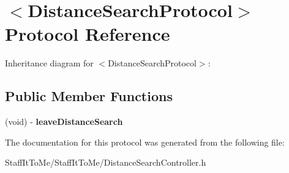 \hypertarget{protocol_distance_search_protocol-p}{
\section{$<$\-Distance\-Search\-Protocol$>$ \-Protocol \-Reference}
\label{protocol_distance_search_protocol-p}
}


\-Inheritance diagram for $<$\-Distance\-Search\-Protocol$>$\-:
\subsection*{\-Public \-Member \-Functions}
\begin{DoxyCompactItemize}
\item 
\hypertarget{protocol_distance_search_protocol-p_abab4b8535fdec35a8d810b98d31967b7}{
(void) -\/ {\bfseries leave\-Distance\-Search}}
\label{protocol_distance_search_protocol-p_abab4b8535fdec35a8d810b98d31967b7}

\end{DoxyCompactItemize}


\-The documentation for this protocol was generated from the following file\-:\begin{DoxyCompactItemize}
\item 
\-Staff\-It\-To\-Me/\-Staff\-It\-To\-Me/\-Distance\-Search\-Controller.\-h\end{DoxyCompactItemize}
